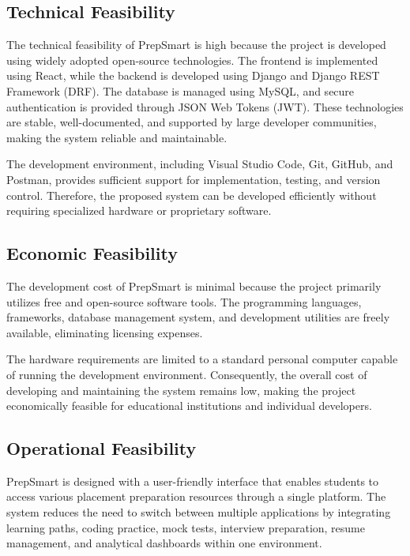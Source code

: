 \subsection{Technical Feasibility}

The technical feasibility of PrepSmart is high because the project is developed using widely adopted open-source technologies. The frontend is implemented using React, while the backend is developed using Django and Django REST Framework (DRF). The database is managed using MySQL, and secure authentication is provided through JSON Web Tokens (JWT). These technologies are stable, well-documented, and supported by large developer communities, making the system reliable and maintainable.

The development environment, including Visual Studio Code, Git, GitHub, and Postman, provides sufficient support for implementation, testing, and version control. Therefore, the proposed system can be developed efficiently without requiring specialized hardware or proprietary software.

\subsection{Economic Feasibility}

The development cost of PrepSmart is minimal because the project primarily utilizes free and open-source software tools. The programming languages, frameworks, database management system, and development utilities are freely available, eliminating licensing expenses.

The hardware requirements are limited to a standard personal computer capable of running the development environment. Consequently, the overall cost of developing and maintaining the system remains low, making the project economically feasible for educational institutions and individual developers.

\subsection{Operational Feasibility}

PrepSmart is designed with a user-friendly interface that enables students to access various placement preparation resources through a single platform. The system reduces the need to switch between multiple applications by integrating learning paths, coding practice, mock tests, interview preparation, resume management, and analytical dashboards within one environment.

